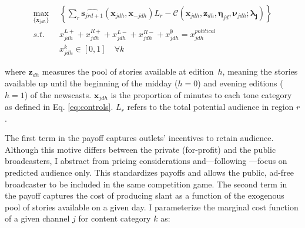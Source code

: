 \documentclass[12pt]{article}
\begin{document}
\begin{equation}\label{eq:payoffs}
	\begin{aligned}
		\max_{\{\mathbf{x}_{jdh}\}}   & \left\{   \sum_{r}\widehat{\bm{s}_{jrd+1}}(\bm{x}_{jdh}, \bm{x}_{-jdh})L_r -  \mathcal{C}\left(  \bm{x}_{jdh},\bm{z}_{dh}, \bm{\eta}_{jd},\bm{\nu}_{jdh}; \bm{\lambda_j}   \right)    \right\}\\
		s.t.   \quad &   x_{jdh}^{L+} +x_{jdh}^{R+} + x_{jdh}^{L-} + x_{jdh}^{R-} + x_{jdh}^{\emptyset} = x_{jdh}^{political}\\
		& x_{jdh}^k \in [0,1] \quad \forall k
	\end{aligned}
\end{equation} 



where $\bm z_{dh}$ measures the pool of stories available at edition~$h$, meaning the stories available up until the beginning of the midday ($h=0$) and evening editions ($h=1$) of the newscasts. $\bm x_{jdh}$ is the proportion of minutes to each tone category as defined in Eq. \ref{eq:controls}. $L_r$  refers to the total potential audience in region $r$. 

The first term in the payoff captures outlets’ incentives to retain audience. Although this motive differs between the private (for-profit)  and the public broadcasters, I abstract from pricing considerations and—following \cite{Goettler2001SpatialCI}—focus on predicted audience only. This standardizes payoffs and allows the public, ad-free broadcaster to be included in the same competition game. The second term in the payoff captures the cost of producing slant as a function of the exogenous pool of stories available on a given day. I parameterize the marginal cost function of a given channel $j$ for content category $k$ as:

\end{document}
